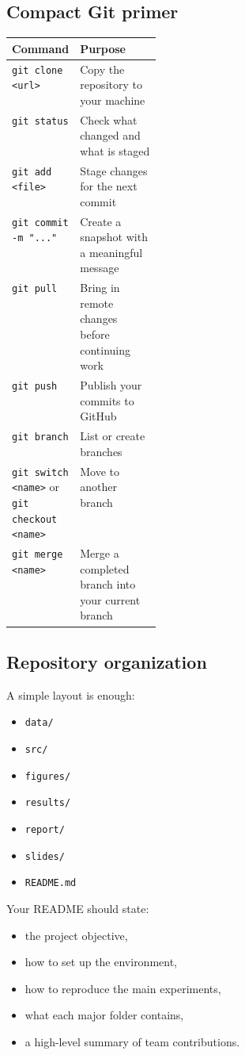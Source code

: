 \documentclass[11pt]{article}
\begin{document}
\subsection{Compact Git primer}

\begin{tabularx}{\linewidth}{>{\ttfamily\raggedright\arraybackslash}p{0.22\linewidth} >{\raggedright\arraybackslash}X}
\toprule
\textbf{Command} & \textbf{Purpose} \\
\midrule
\verb|git clone <url>| & Copy the repository to your machine \\
\verb|git status| & Check what changed and what is staged \\
\verb|git add <file>| & Stage changes for the next commit \\
\verb|git commit -m "..."| & Create a snapshot with a meaningful message \\
\verb|git pull| & Bring in remote changes before continuing work \\
\verb|git push| & Publish your commits to GitHub \\
\verb|git branch| & List or create branches \\
\verb|git switch <name>| or \verb|git checkout <name>| & Move to another branch \\
\verb|git merge <name>| & Merge a completed branch into your current branch \\
\bottomrule
\end{tabularx}

\subsection{Repository organization}

A simple layout is enough:

\begin{itemize}
    \item \verb|data/|
    \item \verb|src/|
    \item \verb|figures/|
    \item \verb|results/|
    \item \verb|report/|
    \item \verb|slides/|
    \item \verb|README.md|
\end{itemize}

Your README should state:

\begin{itemize}
    \item the project objective,
    \item how to set up the environment,
    \item how to reproduce the main experiments,
    \item what each major folder contains,
    \item a high-level summary of team contributions.
\end{itemize}
\end{document}
